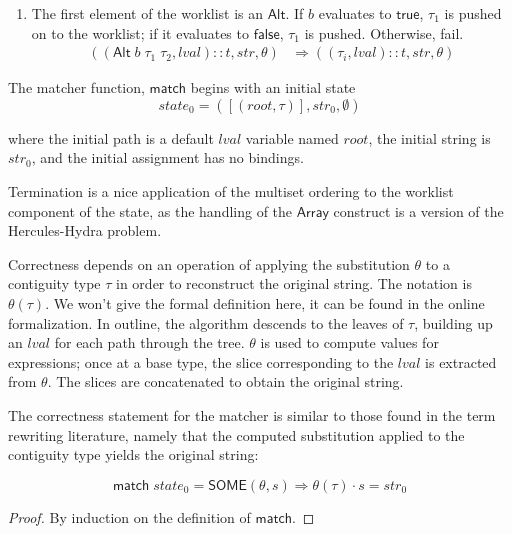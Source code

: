 \documentclass[a4paper,UKenglish,cleveref, autoref, thm-restate]{lipics-v2021}
\newcommand{\konst}[1]{\ensuremath{\mathsf{#1}}}
\newcommand{\imp}{\Rightarrow}
\newcommand{\lval}{\ensuremath{\mathit{lval}}}
\begin{document}
\begin{definition}
\begin{enumerate}
\item The first element of the worklist is an \konst{Alt}. If $b$ evaluates to \konst{true},
  $\tau_1$ is pushed on to the worklist; if it evaluates to \konst{false}, $\tau_1$ is pushed.
  Otherwise, fail.
%
\begin{align*}
((\konst{Alt}\; b\;\tau_1\;\tau_2, \lval)::t, \mathit{str}, \theta)
   &\Rightarrow
  ((\tau_i,\lval)::t,\mathit{str}, \theta)
\end{align*}

\end{enumerate}

\noindent The matcher function, \konst{match} begins with an initial state
%
\[
  \mathit{state}_0 = ([(\mathit{root},\tau)],\mathit{str}_0,\emptyset)
\]

where the initial path is a default \lval{} variable named
$\mathit{root}$, the initial string is $\mathit{str}_0$, and the
initial assignment has no bindings.

\end{definition}

\begin{theorem}
Termination is a nice application of the multiset ordering to the
worklist component of the state, as the handling of the \konst{Array}
construct is a version of the Hercules-Hydra problem.
\end{theorem}


\begin{definition}

Correctness depends on an operation of applying the substitution
$\theta$ to a contiguity type $\tau$ in order to reconstruct the
original string.  The notation is $\theta(\tau)$.  We won't give the
formal definition here, it can be found in the online
formalization. In outline, the algorithm descends to the leaves of
$\tau$, building up an \lval{} for each path through the
tree. $\theta$ is used to compute values for expressions; once at a
base type, the slice corresponding to the \lval{} is extracted from
$\theta$. The slices are concatenated to obtain the original string.

\end{definition}

\begin{theorem}

The correctness statement for the matcher is similar to those found in
the term rewriting literature, namely that the computed substitution
applied to the contiguity type yields the original string:

\[
  \konst{match}\; \mathit{state}_0 = \konst{SOME}(\theta, s)
  \imp \theta(\tau) \cdot s = \mathit{str}_0
\]

\begin{proof}
By induction on the definition of \konst{match}.
\end{proof}
\end{theorem}
\end{document}
